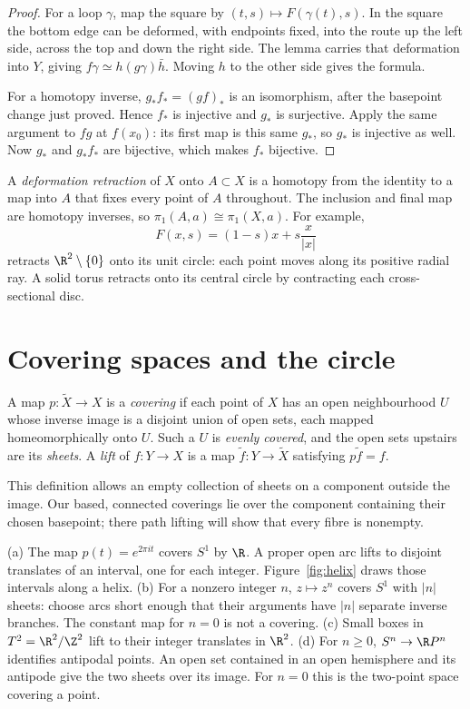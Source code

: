 \begin{proof}
For a loop $\gamma$, map the square by $(t,s)\mapsto F(\gamma(t),s)$. In the square the bottom edge can be deformed, with endpoints fixed, into the route up the left side, across the top and down the right side. The lemma carries that deformation into $Y$, giving $f\gamma\simeq h(g\gamma)\bar h$. Moving $h$ to the other side gives the formula.

For a homotopy inverse, $g_*f_*=(gf)_*$ is an isomorphism, after the basepoint change just proved. Hence $f_*$ is injective and $g_*$ is surjective. Apply the same argument to $fg$ at $f(x_0)$: its first map is this same $g_*$, so $g_*$ is injective as well. Now $g_*$ and $g_*f_*$ are bijective, which makes $f_*$ bijective.
\end{proof}

A \emph{deformation retraction} of $X$ onto $A\subset X$ is a homotopy from the identity to a map into $A$ that fixes every point of $A$ throughout. The inclusion and final map are homotopy inverses, so $\pi_1(A,a)\cong\pi_1(X,a)$. For example,
\[
F(x,s)=(1-s)x+s\frac{x}{|x|}
\]
retracts $\R^2\setminus\{0\}$ onto its unit circle: each point moves along its positive radial ray. A solid torus retracts onto its central circle by contracting each cross-sectional disc.

\section{Covering spaces and the circle}

\begin{definition}
A map $p:\tilde X\to X$ is a \emph{covering} if each point of $X$ has an open neighbourhood $U$ whose inverse image is a disjoint union of open sets, each mapped homeomorphically onto $U$. Such a $U$ is \emph{evenly covered}, and the open sets upstairs are its \emph{sheets}. A \emph{lift} of $f:Y\to X$ is a map $\tilde f:Y\to\tilde X$ satisfying $p\tilde f=f$.
\end{definition}

This definition allows an empty collection of sheets on a component outside the image. Our based, connected coverings lie over the component containing their chosen basepoint; there path lifting will show that every fibre is nonempty.

\begin{example}\label{ex:coverings}
(a) The map $p(t)=e^{2\pi it}$ covers $S^1$ by $\R$. A proper open arc lifts to disjoint translates of an interval, one for each integer. Figure~\ref{fig:helix} draws those intervals along a helix.
(b) For a nonzero integer $n$, $z\mapsto z^n$ covers $S^1$ with $|n|$ sheets: choose arcs short enough that their arguments have $|n|$ separate inverse branches. The constant map for $n=0$ is not a covering.
(c) Small boxes in $T^2=\R^2/\Z^2$ lift to their integer translates in $\R^2$.
(d) For $n\ge0$, $S^n\to\R P^n$ identifies antipodal points. An open set contained in an open hemisphere and its antipode give the two sheets over its image. For $n=0$ this is the two-point space covering a point.
\end{example}


